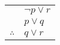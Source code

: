 \documentclass{standalone}
\begin{document}
\begin{tabular}{rl}
    & $\lnot p \lor r$ \\
    & $p \lor q$ \\
    \hline
    $\therefore$ & $q \lor r$
\end{tabular}
\end{document}
